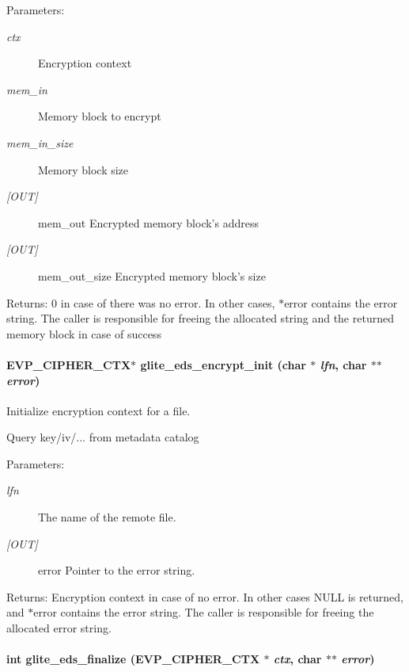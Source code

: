\begin{Desc}
\item[Parameters:]
\begin{description}
\item[{\em ctx}]Encryption context \item[{\em mem\_\-in}]Memory block to encrypt \item[{\em mem\_\-in\_\-size}]Memory block size \item[{\em \mbox{[}OUT\mbox{]}}]mem\_\-out Encrypted memory block's address \item[{\em \mbox{[}OUT\mbox{]}}]mem\_\-out\_\-size Encrypted memory block's size\end{description}
\end{Desc}
\begin{Desc}
\item[Returns:]0 in case of there was no error. In other cases, $\ast$error contains the error string. The caller is responsible for freeing the allocated string and the returned memory block in case of success \end{Desc}
\hypertarget{eds-simple_8h_a2}{
\paragraph[glite\_\-eds\_\-encrypt\_\-init]{\setlength{\rightskip}{0pt plus 5cm}EVP\_\-CIPHER\_\-CTX$\ast$ glite\_\-eds\_\-encrypt\_\-init (char $\ast$ {\em lfn}, char $\ast$$\ast$ {\em error})}\hfill}
\label{eds-simple_8h_a2}


Initialize encryption context for a file. 

Query key/iv/... from metadata catalog

\begin{Desc}
\item[Parameters:]
\begin{description}
\item[{\em lfn}]The name of the remote file. \item[{\em \mbox{[}OUT\mbox{]}}]error Pointer to the error string.\end{description}
\end{Desc}
\begin{Desc}
\item[Returns:]Encryption context in case of no error. In other cases NULL is returned, and $\ast$error contains the error string. The caller is responsible for freeing the allocated error string. \end{Desc}
\hypertarget{eds-simple_8h_a8}{
\paragraph[glite\_\-eds\_\-finalize]{\setlength{\rightskip}{0pt plus 5cm}int glite\_\-eds\_\-finalize (EVP\_\-CIPHER\_\-CTX $\ast$ {\em ctx}, char $\ast$$\ast$ {\em error})}\hfill}
\label{eds-simple_8h_a8}


